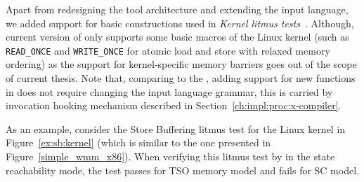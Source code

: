 Apart from redesigning the tool architecture and extending the input language, we added support for basic constructions used in \textit{Kernel litmus tests}~\cite{alglave2018frightening}.
Although, current version of \porthos[2] only supports some basic macros of the Linux kernel (such as \lstinline{READ_ONCE} and \lstinline{WRITE_ONCE} for atomic load and store with relaxed memory ordering) as the support for kernel-specific memory barriers goes out of the scope of current thesis.
Note that, comparing to the \porthos[1], adding support for new functions in \porthos[2] does not require changing the input language grammar, this is carried by invocation hooking mechanism described in Section~\ref{ch:impl:proc:x-compiler}.

As an example, consider the Store Buffering litmus test for the Linux kernel in Figure~\ref{ex:sb:kernel} (which is similar to the one presented in Figure~\ref{simple_wmm_x86}).
When verifying this litmus test by \porthos[2] in the state reachability mode, the test passes for TSO memory model and fails for SC model.

